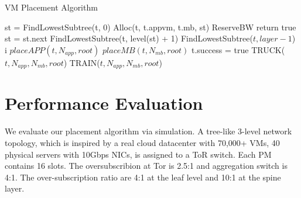 \documentclass[10pt, conference, letterpaper]{IEEEtran}
\begin{document}
\begin{algorithm}[!htbp]
\caption{VM Placement Algorithm}
\label{alg1}
	\begin{algorithmic}[1]
		\State st = FindLowestSubtree(t, 0)
			\State	Alloc(t, t.appvm, t.mb, st)
				\State	ReserveBW
				\State  return true
			\EndIf
		\State st = st.next
			\State FindLowestSubtree(t, level(st) + 1)
		\EndIf
		\EndWhile
		\State{}
	\EndFunction
	\State
						\State\Return FindLowestSubtree($t, layer-1$)
					\EndIf
				\EndFor
				\State\Return i
			\EndIf
		\EndFor
		\State{}
	\EndFunction
	\State
			\State $placeAPP(t, N_{app}, root)$
			\State $placeMB(t, N_{mb}, root)$
				\State t.success = true
			\EndIf
		\Else
				\State TRUCK($t, N_{app}, N_{mb}, root$)
			\Else
				\State TRAIN($t, N_{app}, N_{mb}, root$)			
			\EndIf
		\EndIf
	\EndFunction
	\end{algorithmic}
\end{algorithm}





\section{Performance Evaluation}\label{sec:simulation}
We evaluate our placement algorithm via simulation. A tree-like 3-level network topology, which is inspired by a real cloud datacenter with 70,000+ VMs, 40 physical servers with 10Gbps NICs, is assigned to a ToR switch. Each PM contains 16 slots. The oversubscribion at Tor is 2.5:1 and aggregation switch is 4:1. The over-subscription ratio are 4:1 at the leaf level and 10:1 at the spine layer.
\end{document}
